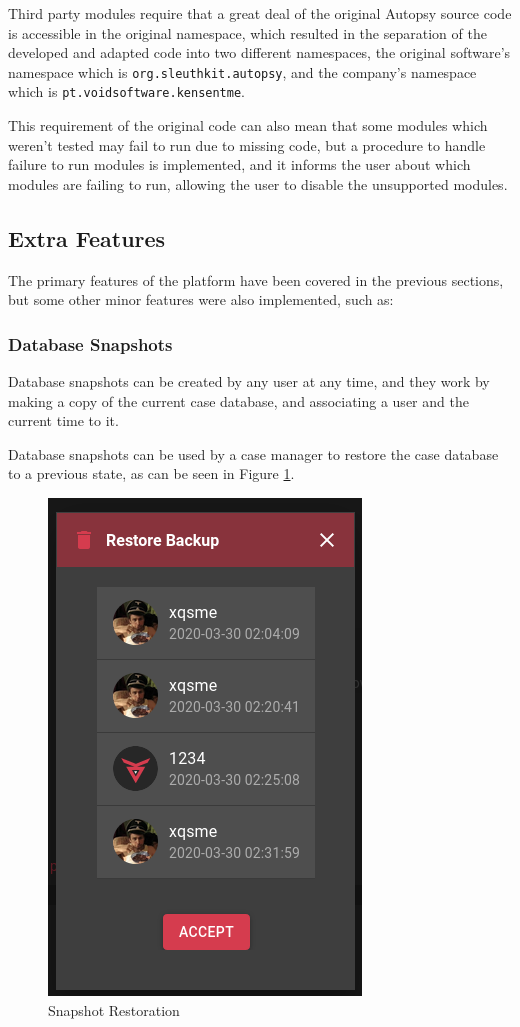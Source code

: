 Third party modules require that a great deal of the original Autopsy source code is accessible in the original namespace, which resulted in the separation of the
developed and adapted code into two different namespaces, the original software's namespace which is \texttt{org.sleuthkit.autopsy}, and the company's namespace which is \texttt{pt.voidsoftware.kensentme}. 

This requirement of the original code can also mean that some modules which weren't tested may fail to run due to missing code, but a procedure to handle failure to run modules is implemented, 
and it informs the user about which modules are failing to run, allowing the user to disable the unsupported modules.

\subsection{Extra Features}

The primary features of the platform have been covered in the previous sections, but some other minor features were also implemented, such as:

\subsubsection*{Database Snapshots}

Database snapshots can be created by any user at any time, and they work by making a copy of the current case database, and associating a user and the current time to it.

Database snapshots can be used by a case manager to restore the case database to a previous state, as can be seen in Figure \ref{fig:snapshotrestore}.

\begin{figure}[ht]
 \centering
 \includegraphics[width=0.35\linewidth]{imgs/snapshotrestore.png}
 \caption{Snapshot Restoration}
 \label{fig:snapshotrestore}
\end{figure}

